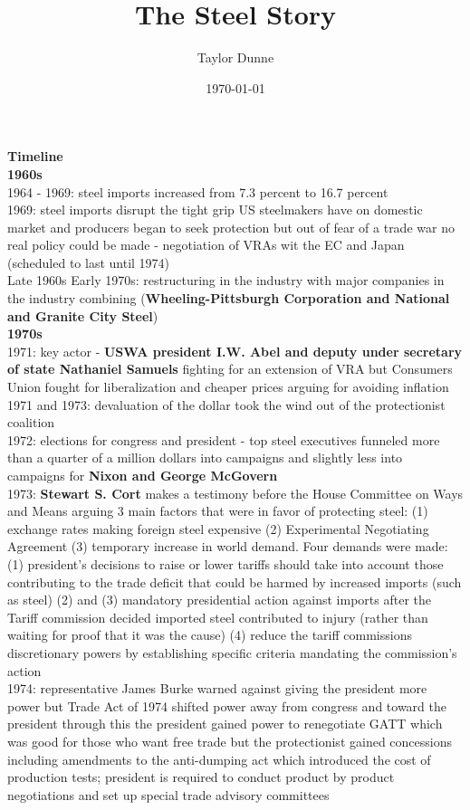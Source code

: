 \documentclass[10pt]{article}
\begin{document}
\title{\vskip-0.6in The Steel Story}
\author{Taylor Dunne}
\date{\today}

\large\textbf{Timeline}\\
\normalsize\textbf{1960s}\\
\normalsize 1964 - 1969: steel imports increased from 7.3 percent to 16.7 percent\\
1969: steel imports disrupt the tight grip US steelmakers have on domestic market and producers began to seek protection but out of fear of a trade war no real policy could be made - negotiation of VRAs wit the EC and Japan (scheduled to last until 1974)\\
Late 1960s Early 1970s: restructuring in the industry with major companies in the industry combining (\textbf{Wheeling-Pittsburgh Corporation and National and Granite City Steel})\\
\normalsize\textbf{1970s}\\
1971: key actor - \textbf{USWA president I.W. Abel and deputy under secretary of state Nathaniel Samuels} fighting for an extension of VRA but Consumers Union fought for liberalization and cheaper prices arguing for avoiding inflation\\
1971 and 1973: devaluation of the dollar took the wind out of the protectionist coalition\\  
1972: elections for congress and president - top steel executives funneled more than a quarter of a million dollars into campaigns and slightly less into campaigns for \textbf{Nixon and George McGovern}\\
1973: \textbf{Stewart S. Cort} makes a testimony before the House Committee on Ways and Means arguing 3 main factors that were in favor of protecting steel: (1) exchange rates making foreign steel expensive (2) Experimental Negotiating Agreement (3) temporary increase in world demand. Four demands were made: (1) president's decisions to raise or lower tariffs should take into account those contributing to the trade deficit that could be harmed by increased imports (such as steel) (2) and (3) mandatory presidential action against imports after the Tariff commission decided imported steel contributed to injury (rather than waiting for proof that it was the cause) (4) reduce the tariff commissions discretionary powers by establishing specific criteria mandating the commission's action\\
1974: representative James Burke warned against giving the president more power but Trade Act of 1974 shifted power away from congress and toward the president through this the president gained power to renegotiate GATT which was good for those who want free trade but the protectionist gained concessions including amendments to the anti-dumping act which introduced the cost of production tests; president is required to conduct product by product negotiations and set up special trade advisory committees\\ 
\end{document}
